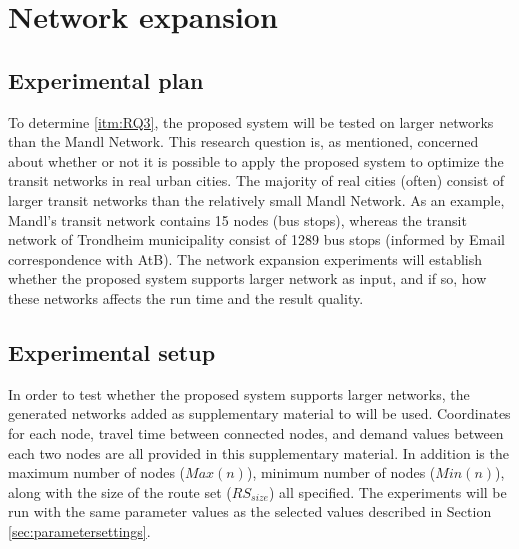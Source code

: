 \section{Network expansion}

\subsection{Experimental plan}
To determine \vref{itm:RQ3}, the proposed system will be tested on larger networks than the Mandl Network. This research question is, as mentioned, concerned about whether or not it is possible to apply the proposed system to optimize the transit networks in real urban cities. The majority of real cities (often) consist of larger transit networks than the relatively small Mandl Network. As an example, Mandl's transit network contains 15 nodes (bus stops), whereas the transit network of Trondheim municipality consist of 1289 bus stops (informed by Email correspondence with AtB\citep{website:atb}). The network expansion experiments will establish whether the proposed system supports larger network as input, and if so, how these networks affects the run time and the result quality.



\subsection{Experimental setup}
\label{subsec:scalabilityExperiments_setup}

In order to test whether the proposed system supports larger networks, the generated networks added as supplementary material to \citet{mumford13} will be used. Coordinates for each node, travel time between connected nodes, and demand values between each two nodes are all provided in this supplementary material. In addition is the maximum number of nodes ($Max(n)$), minimum number of nodes ($Min(n)$), along with the size of the route set ($RS_{size}$) all specified. The experiments will be run with the same parameter values as the selected values described in Section \vref{sec:parametersettings}.

